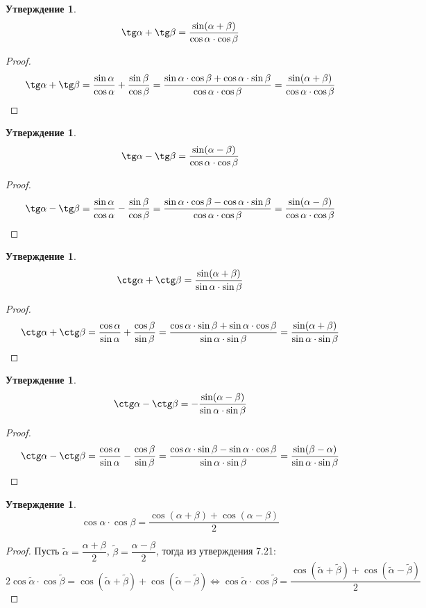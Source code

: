 \documentclass[12pt]{article}
\theoremstyle{definition}
\newtheorem{statement}[theorem]{Утверждение}
\begin{document}
    \begin{statement}
        $$\tg\alpha+\tg\beta=\dfrac{\sin(\alpha+\beta)}{\cos\alpha\cdot\cos\beta}$$
    \end{statement}
    \begin{proof}
        $$\tg\alpha+\tg\beta=\dfrac{\sin\alpha}{\cos\alpha}+\dfrac{\sin\beta}{\cos\beta}=\dfrac{\sin\alpha\cdot\cos\beta+\cos\alpha\cdot\sin\beta}{\cos\alpha\cdot\cos\beta}=\dfrac{\sin(\alpha+\beta)}{\cos\alpha\cdot\cos\beta}$$
    \end{proof}
    \begin{statement}
        $$\tg\alpha-\tg\beta=\dfrac{\sin(\alpha-\beta)}{\cos\alpha\cdot\cos\beta}$$
    \end{statement}
    \begin{proof}
        $$\tg\alpha-\tg\beta=\dfrac{\sin\alpha}{\cos\alpha}-\dfrac{\sin\beta}{\cos\beta}=\dfrac{\sin\alpha\cdot\cos\beta-\cos\alpha\cdot\sin\beta}{\cos\alpha\cdot\cos\beta}=\dfrac{\sin(\alpha-\beta)}{\cos\alpha\cdot\cos\beta}$$
    \end{proof}
    \begin{statement}
        $$\ctg\alpha+\ctg\beta=\dfrac{\sin(\alpha+\beta)}{\sin\alpha\cdot\sin\beta}$$
    \end{statement}
    \begin{proof}
        $$\ctg\alpha+\ctg\beta=\dfrac{\cos\alpha}{\sin\alpha}+\dfrac{\cos\beta}{\sin\beta}=\dfrac{\cos\alpha\cdot\sin\beta+\sin\alpha\cdot\cos\beta}{\sin\alpha\cdot\sin\beta}=\dfrac{\sin(\alpha+\beta)}{\sin\alpha\cdot\sin\beta}$$
    \end{proof}
    \begin{statement}
        $$\ctg\alpha-\ctg\beta=-\dfrac{\sin(\alpha-\beta)}{\sin\alpha\cdot\sin\beta}$$
    \end{statement}
    \begin{proof}
        $$\ctg\alpha-\ctg\beta=\dfrac{\cos\alpha}{\sin\alpha}-\dfrac{\cos\beta}{\sin\beta}=\dfrac{\cos\alpha\cdot\sin\beta-\sin\alpha\cdot\cos\beta}{\sin\alpha\cdot\sin\beta}=\dfrac{\sin(\beta-\alpha)}{\sin\alpha\cdot\sin\beta}$$
    \end{proof}
    \begin{statement}
        $$\cos\alpha\cdot\cos\beta=\dfrac{\cos(\alpha+\beta)+\cos(\alpha-\beta)}{2}$$
    \end{statement}
    \begin{proof}
        Пусть $\tilde{\alpha} = \dfrac{\alpha+\beta}{2}$, $\tilde{\beta} = \dfrac{\alpha-\beta}{2}$, тогда из утверждения 7.21:
        $$2\cos\tilde{\alpha}\cdot\cos\tilde{\beta}=\cos(\tilde{\alpha}+\tilde{\beta})+\cos(\tilde{\alpha}-\tilde{\beta})\Longleftrightarrow \cos\tilde{\alpha}\cdot\cos\tilde{\beta}=\dfrac{\cos(\tilde{\alpha}+\tilde{\beta})+\cos(\tilde{\alpha}-\tilde{\beta})}{2}$$
    \end{proof}
\end{document}
